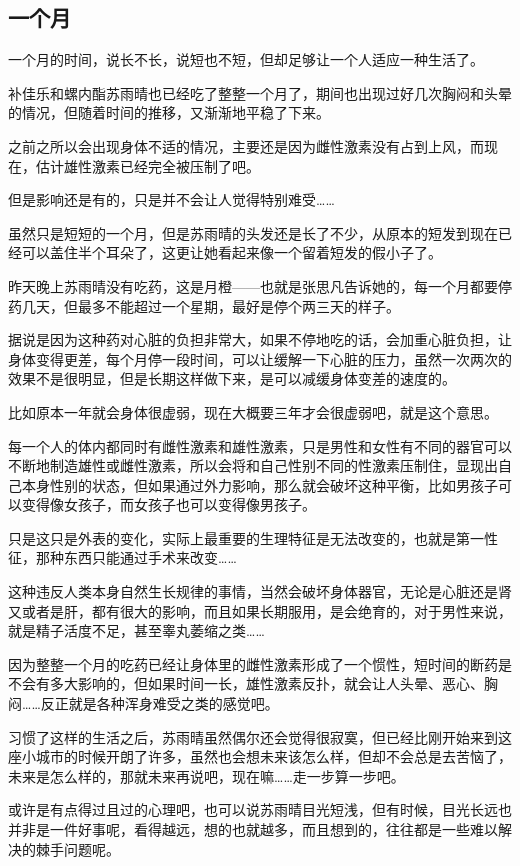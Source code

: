 \subsection{一个月}

一个月的时间，说长不长，说短也不短，但却足够让一个人适应一种生活了。

补佳乐和螺内酯苏雨晴也已经吃了整整一个月了，期间也出现过好几次胸闷和头晕的情况，但随着时间的推移，又渐渐地平稳了下来。

之前之所以会出现身体不适的情况，主要还是因为雌性激素没有占到上风，而现在，估计雄性激素已经完全被压制了吧。

但是影响还是有的，只是并不会让人觉得特别难受……

虽然只是短短的一个月，但是苏雨晴的头发还是长了不少，从原本的短发到现在已经可以盖住半个耳朵了，这更让她看起来像一个留着短发的假小子了。

昨天晚上苏雨晴没有吃药，这是月橙——也就是张思凡告诉她的，每一个月都要停药几天，但最多不能超过一个星期，最好是停个两三天的样子。

据说是因为这种药对心脏的负担非常大，如果不停地吃的话，会加重心脏负担，让身体变得更差，每个月停一段时间，可以让缓解一下心脏的压力，虽然一次两次的效果不是很明显，但是长期这样做下来，是可以减缓身体变差的速度的。

比如原本一年就会身体很虚弱，现在大概要三年才会很虚弱吧，就是这个意思。

每一个人的体内都同时有雌性激素和雄性激素，只是男性和女性有不同的器官可以不断地制造雄性或雌性激素，所以会将和自己性别不同的性激素压制住，显现出自己本身性别的状态，但如果通过外力影响，那么就会破坏这种平衡，比如男孩子可以变得像女孩子，而女孩子也可以变得像男孩子。

只是这只是外表的变化，实际上最重要的生理特征是无法改变的，也就是第一性征，那种东西只能通过手术来改变……

这种违反人类本身自然生长规律的事情，当然会破坏身体器官，无论是心脏还是肾又或者是肝，都有很大的影响，而且如果长期服用，是会绝育的，对于男性来说，就是精子活度不足，甚至睾丸萎缩之类……

因为整整一个月的吃药已经让身体里的雌性激素形成了一个惯性，短时间的断药是不会有多大影响的，但如果时间一长，雄性激素反扑，就会让人头晕、恶心、胸闷……反正就是各种浑身难受之类的感觉吧。

习惯了这样的生活之后，苏雨晴虽然偶尔还会觉得很寂寞，但已经比刚开始来到这座小城市的时候开朗了许多，虽然也会想未来该怎么样，但却不会总是去苦恼了，未来是怎么样的，那就未来再说吧，现在嘛……走一步算一步吧。

或许是有点得过且过的心理吧，也可以说苏雨晴目光短浅，但有时候，目光长远也并非是一件好事呢，看得越远，想的也就越多，而且想到的，往往都是一些难以解决的棘手问题呢。

